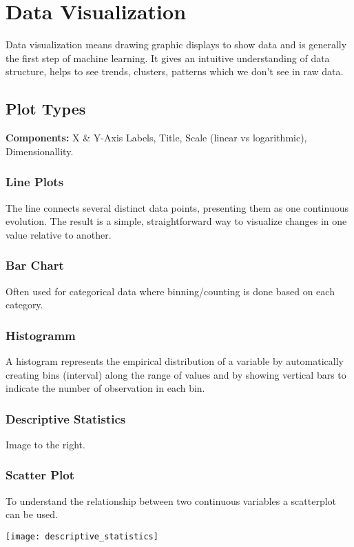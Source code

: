 \section{Data Visualization}
Data visualization means drawing graphic displays to show data and is generally the first step of machine learning. It gives an  intuitive understanding of data structure,  helps to see trends, clusters, patterns which we don't see in raw data.

\subsection{Plot Types}
\textbf{Components:} X \& Y-Axis Labels, Title, Scale (linear vs logarithmic), Dimensionallity.

\subsubsection{Line Plots}
The line connects several distinct data points, presenting them as one continuous evolution. The result is a simple, straightforward way to visualize changes in one value relative to another.

\subsubsection{Bar Chart}
Often used for categorical data where binning/counting  is done based on each category. 

\subsubsection{Histogramm}
A histogram represents the empirical distribution of a variable by automatically creating bins (interval) along the range of values and by showing vertical bars to indicate the number of observation in each bin.\\

\begin{minipage}{0,5\linewidth}
    \subsubsection{Descriptive Statistics}
    Image to the right.
    \subsubsection{Scatter Plot}
    To understand the relationship between two continuous variables a scatterplot can be used.
\end{minipage}
\begin{minipage}{0,5\linewidth}
    \texttt{[image: descriptive\_statistics]}
\end{minipage}

